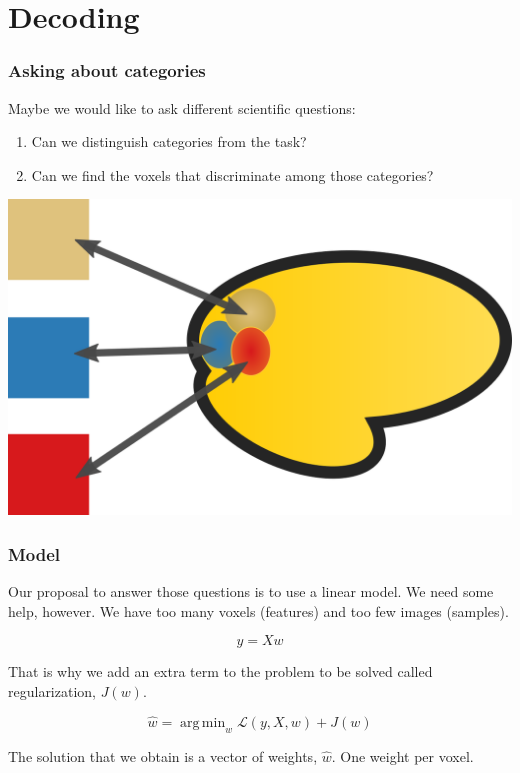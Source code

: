 \documentclass[11pt]{beamer}
\DeclareMathOperator*{\argmin}{arg\,min}
\begin{document}
\section{Decoding}
\label{sec:Decoding}

\begin{frame}
    \frametitle{Asking about categories}

    Maybe we would like to ask different scientific questions:
    \begin{enumerate}
        \item Can we distinguish categories from the task?
        \item Can we find the voxels that discriminate among those categories?
    \end{enumerate}

    \begin{center}
        \includegraphics[scale=0.2]{figures/decoding.png}
    \end{center}

\end{frame}

\begin{frame}
    \frametitle{Model}
    Our proposal to answer those questions is to use a linear model. We need
    some help, however. We have too many voxels (features) and too few images
    (samples). 

    \[y = Xw\]

    That is why we add an extra term to the problem to be solved called
    regularization, $J(w)$.

    \[\hat{w} = \argmin_{w} \mathcal{L}\left(y, X, w \right) + J(w) \]

    The solution that we obtain is a vector of weights, $\hat{w}$. One weight
    per voxel.
\end{frame}
\end{document}
